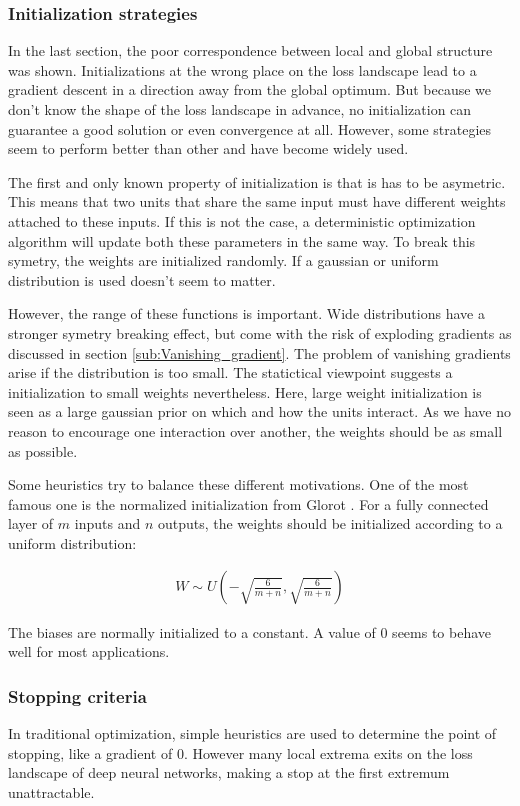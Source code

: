 \subsubsection{Initialization strategies}\label{sub:Initialization_strategies}
In the last section, the poor correspondence between local and global structure
was shown. Initializations at the wrong place on the loss landscape lead to a
gradient descent in a direction away from the global optimum. But because we
don't know the shape of the loss landscape in advance, no initialization can
guarantee a good solution or even convergence at all. However, some strategies
seem to perform better than other and have become widely used.

The first and only known property of initialization is that is has to be
asymetric. This means that two units that share the same input must have
different weights attached to these inputs. If this is not the case, a
deterministic optimization algorithm will update both these parameters in the
same way. To break this symetry, the weights are initialized randomly. If a
gaussian or uniform distribution is used doesn't seem to matter.

However, the range of these functions is important. Wide distributions have a
stronger symetry breaking effect, but come with the risk of exploding gradients
as discussed in section \ref{sub:Vanishing_gradient}. The problem of vanishing
gradients arise if the distribution is too small. The statictical viewpoint
suggests a initialization to small weights nevertheless. Here, large weight
initialization is seen as a large gaussian prior on which and how the units
interact. As we have no reason to encourage one interaction over another, the
weights should be as small as possible. 

Some heuristics try to balance these different motivations. One of the most
famous one is the normalized initialization from Glorot
\cite{glorot2010understanding}. For a fully connected layer of $m$ inputs and
$n$ outputs, the weights should be initialized according to a uniform
distribution:

\begin{align}
    W \sim U(-\sqrt{\frac{6}{m+n}}, \sqrt{\frac{6}{m+n}})
\end{align}

The biases are normally initialized to a constant. A value of 0 seems to behave
well for most applications.




\subsubsection{Stopping criteria}\label{sub:Stopping_criteria}
In traditional optimization, simple heuristics are used to determine the point
of stopping, like a gradient of 0. However many local extrema exits on the loss
landscape of deep neural networks, making a stop at the first extremum
unattractable.

